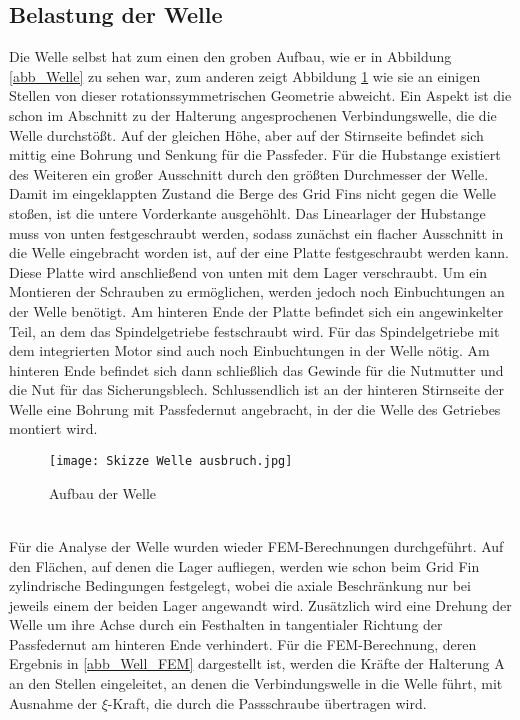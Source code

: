 \subsection{Belastung der Welle}
Die Welle selbst hat zum einen den groben Aufbau, wie er in Abbildung \ref{abb_Welle} zu sehen war, zum anderen zeigt Abbildung \ref{abb_aufbau_Welle} wie sie an einigen Stellen von dieser rotationssymmetrischen Geometrie abweicht. Ein Aspekt ist die schon im Abschnitt zu der Halterung angesprochenen Verbindungswelle, die die Welle durchstößt. Auf der gleichen Höhe, aber auf der Stirnseite befindet sich mittig eine Bohrung und Senkung für die Passfeder. Für die Hubstange existiert des Weiteren ein großer Ausschnitt durch den größten Durchmesser der Welle. Damit im eingeklappten Zustand die Berge des Grid Fins nicht gegen die Welle stoßen, ist die untere Vorderkante ausgehöhlt. Das Linearlager der Hubstange muss von unten festgeschraubt werden, sodass zunächst ein flacher Ausschnitt in die Welle eingebracht worden ist, auf der eine Platte festgeschraubt werden kann. Diese Platte wird anschließend von unten mit dem Lager verschraubt. Um ein Montieren der Schrauben zu ermöglichen, werden jedoch noch Einbuchtungen an der Welle benötigt. Am hinteren Ende der Platte befindet sich ein angewinkelter Teil, an dem das Spindelgetriebe festschraubt wird.
Für das Spindelgetriebe mit dem integrierten Motor sind auch noch Einbuchtungen in der Welle nötig. Am hinteren Ende befindet sich dann schließlich das Gewinde für die Nutmutter und die Nut für das Sicherungsblech. Schlussendlich ist an der hinteren Stirnseite der Welle eine Bohrung mit Passfedernut angebracht, in der die Welle des Getriebes montiert wird.
\begin{figure}[h] 
	\centering
	\texttt{[image: Skizze Welle ausbruch.jpg]}
	\caption{Aufbau der Welle}
	\label{abb_aufbau_Welle}
\end{figure}\\
Für die Analyse der Welle wurden wieder FEM-Berechnungen durchgeführt. Auf den Flächen, auf denen die Lager aufliegen, werden wie schon beim Grid Fin zylindrische Bedingungen festgelegt, wobei die axiale Beschränkung nur bei jeweils einem der beiden Lager angewandt wird. Zusätzlich wird eine Drehung der Welle um ihre Achse durch ein Festhalten in tangentialer Richtung der Passfedernut am hinteren Ende verhindert.
Für die FEM-Berechnung, deren Ergebnis in \ref{abb_Well_FEM} dargestellt ist, werden die Kräfte der Halterung A an den Stellen eingeleitet, an denen die Verbindungswelle in die Welle führt, mit Ausnahme der $\xi$-Kraft, die durch die Passschraube übertragen wird. 
